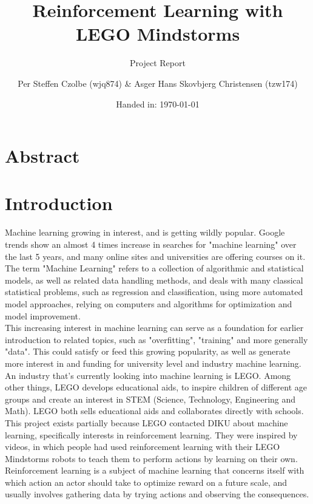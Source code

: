 \documentclass[11pt, a4paper]{article}
\author{Per Steffen Czolbe (wjq874) \& Asger Hans Skovbjerg Christensen (tzw174)}
\title{Reinforcement Learning with LEGO Mindstorms}
\subtitle{Project Report}
\date{Handed in: \today}
\begin{document}
\maketitle

\section{Abstract}

\tableofcontents


\section{Introduction}
Machine learning growing in interest, and is getting wildly popular. Google trends show an almost 4 times increase in searches for "machine learning" over the last 5 years, and many online sites and universities are offering courses on it. \\
The term "Machine Learning" refers to a collection of algorithmic and statistical models, as well as related data handling methods, and deals with many classical statistical problems, such as regression and classification, using more automated model approaches, relying on computers and algorithms for optimization and model improvement. \\
This increasing interest in machine learning can serve as a foundation for earlier introduction to related topics, such as "overfitting", "training" and more generally "data". This could satisfy or feed this growing popularity, as well as generate more interest in and funding for university level and industry machine learning. \\
An industry that's currently looking into machine learning is LEGO. Among other things, LEGO develops educational aids, to inspire children of different age groups and create an interest in STEM (Science, Technology, Engineering and Math)\cite{LEGOeducation}. LEGO both sells educational aids and collaborates directly with schools\cite{naerheden}. This project exists partially because LEGO contacted DIKU about machine learning, specifically interests in reinforcement learning. They were inspired by videos, in which people had used reinforcement learning with their LEGO Mindstorms robots to teach them to perform actions by learning on their own\cite{youtube_crawl}\cite{youtube_swing}. Reinforcement learning is a subject of machine learning that concerns itself with which action an actor should take to optimize reward on a future scale, and usually involves gathering data by trying actions and observing the consequences. \\
\end{document}
